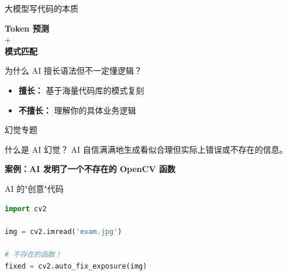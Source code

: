 
\begin{frame}{大模型写代码的本质}
	\begin{center}
		\Huge \textbf{Token 预测} \\[0.5cm]
		\Large + \\[0.5cm]
		\Huge \textbf{模式匹配}
	\end{center}

	\vspace{0.5cm}

	\begin{block}{为什么 AI 擅长语法但不一定懂逻辑？}
		\begin{itemize}
			\item \textbf{擅长：} 基于海量代码库的模式复刻
			\item \textbf{不擅长：} 理解你的具体业务逻辑
		\end{itemize}
	\end{block}
\end{frame}


\begin{frame}[fragile]{幻觉专题}
	\begin{alertblock}{什么是 AI 幻觉？}
		AI 自信满满地生成看似合理但实际上错误或不存在的信息。
	\end{alertblock}

	\vspace{0.3cm}

	\textbf{案例：AI 发明了一个不存在的 OpenCV 函数}

	\begin{exampleblock}{AI 的"创意"代码}
		\begin{lstlisting}[language=Python, basicstyle=\ttfamily\tiny]
import cv2

img = cv2.imread('exam.jpg')

# 不存在的函数！
fixed = cv2.auto_fix_exposure(img)
\end{lstlisting}
	\end{exampleblock}
\end{frame}


